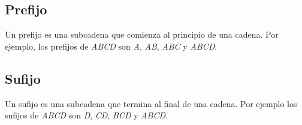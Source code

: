 \subsection{Prefijo}
Un prefijo es una subcadena que comienza al principio de una cadena. Por ejemplo, los prefijos de \emph{ABCD} son \emph{A}, \emph{AB}, \emph{ABC} y \emph{ABCD}. 

\subsection{Sufijo}
Un sufijo es una subcadena que termina al final de una cadena. Por ejemplo los sufijos de \emph{ABCD} son \emph{D}, \emph{CD}, \emph{BCD} y \emph{ABCD}.